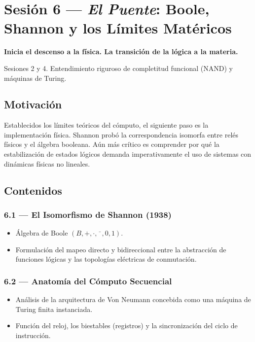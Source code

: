 \documentclass[11pt, letterpaper]{article}
\begin{document}
\newpage

\section{Sesi\'on 6 --- \textit{El Puente}: Boole, Shannon y los L\'imites Mat\'ericos}

\textcolor{mitred}{\textbf{Inicia el descenso a la f\'isica. La transici\'on de la l\'ogica a la materia.}}

\begin{prereqs}
Sesiones 2 y 4. Entendimiento riguroso de completitud funcional (NAND) y m\'aquinas de Turing.
\end{prereqs}

\subsection*{Motivaci\'on}
Establecidos los l\'imites te\'oricos del c\'omputo, el siguiente paso es la implementaci\'on f\'isica. Shannon prob\'o la correspondencia isomorfa entre rel\'es f\'isicos y el \'algebra booleana. A\'un m\'as cr\'itico es comprender por qu\'e la estabilizaci\'on de estados l\'ogicos demanda imperativamente el uso de sistemas con din\'amicas f\'isicas no lineales.

\subsection{Contenidos}

\subsubsection{6.1 --- El Isomorfismo de Shannon (1938)}
\begin{itemize}
  \item \'Algebra de Boole $(B,+,\cdot,\bar{\phantom{x}},0,1)$.
  \item Formulaci\'on del mapeo directo y bidireccional entre la abstracci\'on de funciones l\'ogicas y las topolog\'ias el\'ectricas de conmutaci\'on.
\end{itemize}

\subsubsection{6.2 --- Anatom\'ia del C\'omputo Secuencial}
\begin{itemize}
  \item An\'alisis de la arquitectura de Von Neumann concebida como una m\'aquina de Turing finita instanciada.
  \item Funci\'on del reloj, los biestables (registros) y la sincronizaci\'on del ciclo de instrucci\'on.
\end{itemize}
\end{document}
